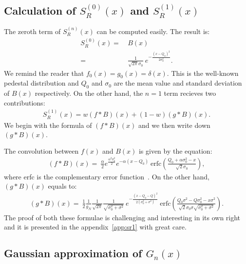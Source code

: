 \documentclass[a4paper,11pt]{article}
\begin{document}
\subsection{Calculation of $S^{(0)}_R(x)$ and $S^{(1)}_R(x)$}
%

The zeroth term of $S^{(n)}_R(x)$ can be computed easily. 
The result is:
\begin{align}
S^{(0)}_R(x)  = \ & B(x) \nonumber \\
                      = \ & \frac{1}{\sqrt{2\pi}\sigma_0} \ e^{-\frac{(x-Q_0)^2}{2\sigma_0^2}}.
\end{align}
We remind the reader that $f_0(x)=g_0(x)=\delta (x)$. 
This is the well-known pedestal distribution and $Q_0$ and $\sigma_0$ are the mean value and standard deviation of $B(x)$ respectively. 
On the other hand, the $n=1$ term recieves two contributions:
\begin{align}
S^{(1)}_R(x)  = w (f*B)(x) + (1-w)(g*B)(x). 
\end{align}                     
We begin with the formula of $(f*B)(x)$ and we then write down $(g*B)(x)$.

The convolution between $f(x)$ and $B(x)$ is given by the equation:
\begin{align}
(f*B)(x)  = \ \frac{\alpha}{2} e^{\frac{\alpha^2\sigma_0^2}{2}} e^{-\alpha (x-Q_0)} \ \text{erfc}\left( \frac{Q_0 + \alpha\sigma_0^2 - x }{\sqrt{2}\sigma_0} \right),
\end{align}  
where erfc is the complementary error function~\cite{error}.
On the other hand, $(g*B)(x)$ equals to:
\begin{align}
(g*B)(x)  = \ \frac{1}{2} \frac{1}{g_N} \frac{1}{\sqrt{2\pi}} \frac{1}{\sqrt{\sigma_0^2 + \sigma^2}} \ e^{ -\frac{ (x-Q_0-Q)^2 }{2(\sigma_0^2 + \sigma^2)}} 
\ \text{erfc}\left(  \frac{ Q_0\sigma^2 -Q\sigma_0^2 -x \sigma^2  }{\sqrt{2} \sigma_0\sigma\sqrt{\sigma_0^2 + \sigma^2} }   \right).
\end{align}  
The proof of both these formulae is challenging and interesting in its own right and it is presented in the appendix~\ref{app:sr1} with great care. 

\subsection{Gaussian approximation of $G_n(x)$}
%
\end{document}
